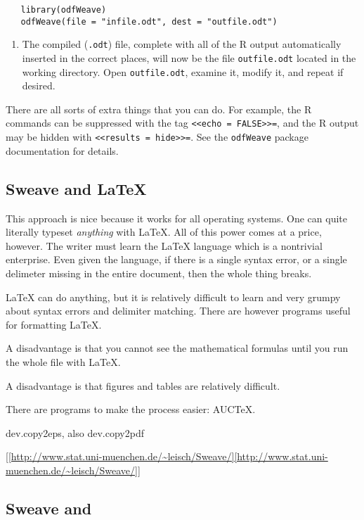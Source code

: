 \documentclass[captions=tableheading]{scrbook}
\begin{document}
\begin{verbatim}
   library(odfWeave)
   odfWeave(file = "infile.odt", dest = "outfile.odt")
\end{verbatim}
\begin{enumerate}
\item The compiled (\texttt{.odt}) file, complete with all of the \textsf{R} output automatically inserted in the correct places, will now be the file \texttt{outfile.odt} located in the working directory. Open \texttt{outfile.odt}, examine it, modify it, and repeat if desired.
\end{enumerate}

There are all sorts of extra things that you can do. For example, the \textsf{R} commands can be suppressed with the tag \texttt{<\textcompwordmark{}<echo = FALSE>\textcompwordmark{}>=}, and the \textsf{R} output may be hidden with \texttt{<\textcompwordmark{}<results = hide>\textcompwordmark{}>=}. See the \texttt{odfWeave} package documentation for details.
\subsection{Sweave and \protect\LaTeX{}}
\label{sec-7-2-3}


This approach is nice because it works for all operating systems. One can quite literally typeset \emph{anything} with \LaTeX{}. All of this power comes at a price, however. The writer must learn the \LaTeX{} language which is a nontrivial enterprise. Even given the language, if there is a single syntax error, or a single delimeter missing in the entire document, then the whole thing breaks.

\LaTeX{} can do anything, but it is relatively difficult to learn  and very grumpy about syntax errors and delimiter matching. There are however programs useful for formatting \LaTeX{}.

A disadvantage is that you cannot see the mathematical formulas until you run the whole file with \LaTeX{}.

A disadvantage is that figures and tables are relatively difficult.

There are programs to make the process easier: AUC\TeX{}.

dev.copy2eps, also dev.copy2pdf

\url{[[http://www.stat.uni-muenchen.de/~leisch/Sweave/][http://www.stat.uni-muenchen.de/~leisch/Sweave/]]}
\subsection{Sweave and \protect\LyX{}}
\label{sec-7-2-4}
\end{document}
